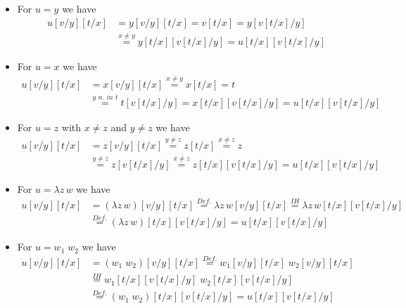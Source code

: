 \documentclass{article}
\begin{document}
\begin{itemize}
\item For $u=y$ we have
\begin{equation*}
\begin{split}
u[v/y][t/x]&=y[v/y][t/x]=v[t/x]=y[v[t/x]/y] \\
&\stackrel{x\neq y}{=}y[t/x][v[t/x]/y]=u[t/x][v[t/x]/y]
\end{split}
\end{equation*}

\item For $u=x$ we have
\begin{equation*}
\begin{split}
u[v/y][t/x]&=x[v/y][t/x]\stackrel{x\neq y}{=}x[t/x]=t\\
&\stackrel{y\textit{ n. in }t}{=} t[v[t/x]/y]=x[t/x][v[t/x]/y]=u[t/x][v[t/x]/y]
\end{split}
\end{equation*}

\item For $u=z$ with $x \neq z$ and $y \neq z$ we have
\begin{equation*}
\begin{split}
u[v/y][t/x]&=z[v/y][t/x]\stackrel{y\neq z}{=}z[t/x]\stackrel{x\neq z}{=}z \\
&\stackrel{y\neq z}{=}z[v[t/x]/y]\stackrel{x\neq z}{=}z[t/x][v[t/x]/y]=u[t/x][v[t/x]/y]
\end{split}
\end{equation*}



\item For $u=\lambda z \, w$ we have
\begin{equation*}
\begin{split}
u[v/y][t/x]&=(\lambda z \, w)[v/y][t/x] \stackrel{Def.}{=} \lambda z \, w[v/y][t/x] \stackrel{IH}{=}
 \lambda z \, w[t/x][v[t/x]/y] \\
 &\stackrel{Def.}{=}  (\lambda z \, w)[t/x][v[t/x]/y]
=u[t/x][v[t/x]/y]
\end{split}
\end{equation*}




\item For $u=w_1\; w_2$ we have
\begin{equation*}
\begin{split}
u[v/y][t/x]&=(w_1\; w_2)[v/y][t/x] \stackrel{Def.}{=} w_1[v/y][t/x]\; w_2[v/y][t/x] \\
&\stackrel{IH}{=}
 w_1[t/x][v[t/x]/y] \; w_2[t/x][v[t/x]/y] \\
 &\stackrel{Def.}{=}  (w_1\; w_2)[t/x][v[t/x]/y]
=u[t/x][v[t/x]/y]
\end{split}
\end{equation*}

\end{itemize}
\end{document}
